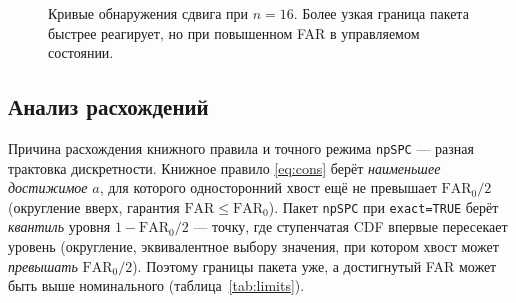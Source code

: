 \documentclass[11pt,a4paper]{article}
\newcommand{\FAR}{\mathrm{FAR}}
\newcommand{\FARz}{\mathrm{FAR}_0}
\newcommand{\SD}{\operatorname{SD}}
\begin{document}
\begin{figure}[htbp]\centering
{}
\caption{Кривые обнаружения сдвига при $n=16$. Более узкая граница пакета
быстрее реагирует, но при повышенном FAR в управляемом состоянии.}
\label{fig:oc}
\end{figure}

\subsection{Анализ расхождений}
\label{sec:disc}

Причина расхождения книжного правила и точного режима \texttt{npSPC} ---
разная трактовка дискретности. Книжное правило \eqref{eq:cons} берёт
\emph{наименьшее достижимое} $a$, для которого односторонний хвост ещё не
превышает $\FARz/2$ (округление вверх, гарантия $\FAR\le\FARz$). Пакет
\texttt{npSPC} при \texttt{exact=TRUE} берёт \emph{квантиль} уровня
$1-\FARz/2$ --- точку, где ступенчатая CDF впервые пересекает уровень
(округление, эквивалентное выбору значения, при котором хвост может
\emph{превышать} $\FARz/2$). Поэтому границы пакета уже, а достигнутый FAR
может быть выше номинального (таблица~\ref{tab:limits}).
\end{document}
